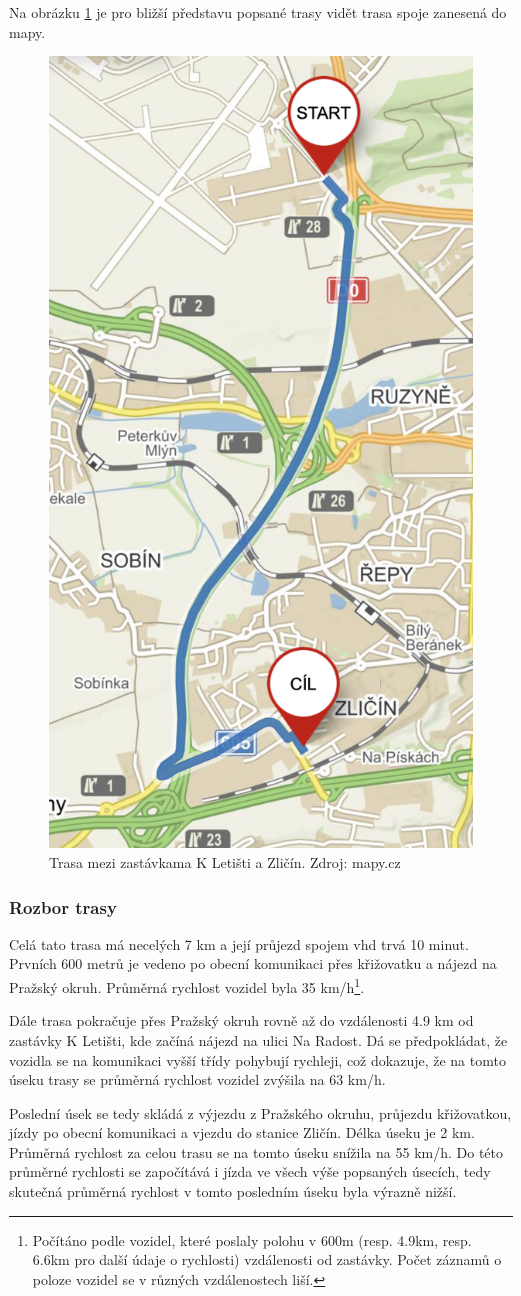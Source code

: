 \bigbreak

Na obrázku \ref{fig:k_letisti_to_zlicin_map} je pro bližší představu popsané trasy vidět trasa spoje zanesená do mapy.

\begin{figure}
	\centering
  \includegraphics[width=0.3\linewidth]{../img/k_letisti_to_zlicin_map.png}
  \caption{Trasa mezi zastávkama K Letišti a Zličín. Zdroj: mapy.cz}
  \label{fig:k_letisti_to_zlicin_map}
\end{figure}

\subsubsection{Rozbor trasy}

Celá tato trasa má necelých 7 km a její průjezd spojem \gls{vhd} trvá 10 minut. Prvních 600 metrů je vedeno po obecní komunikaci přes křižovatku a nájezd na Pražský okruh. Průměrná rychlost vozidel byla 35 km/h\footnote{Počítáno podle vozidel, které poslaly polohu v 600m (resp. 4.9km, resp. 6.6km pro další údaje o rychlosti) vzdálenosti od zastávky. Počet záznamů o poloze vozidel se v různých vzdálenostech liší.}.

\bigbreak

Dále trasa pokračuje přes Pražský okruh rovně až do vzdálenosti 4.9 km od zastávky K Letišti, kde začíná nájezd na ulici Na Radost. Dá se předpokládat, že vozidla se na komunikaci vyšší třídy pohybují rychleji, což dokazuje, že na tomto úseku trasy se průměrná rychlost vozidel zvýšila na 63 km/h.

\bigbreak

Poslední úsek se tedy skládá z výjezdu z Pražského okruhu, průjezdu křižovatkou, jízdy po obecní komunikaci a vjezdu do stanice Zličín. Délka úseku je 2 km. Průměrná rychlost za celou trasu se na tomto úseku snížila na 55 km/h. Do této průměrné rychlosti se započítává i jízda ve všech výše popsaných úsecích, tedy skutečná průměrná rychlost v tomto posledním úseku byla výrazně nižší.


